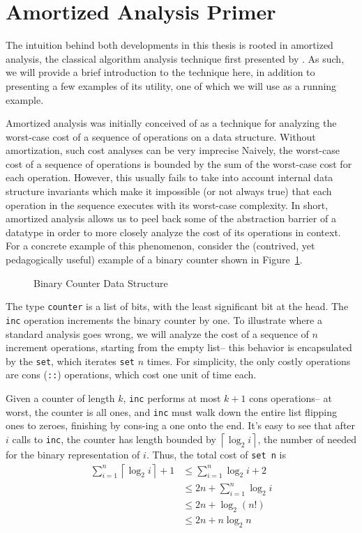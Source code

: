 

\section{Amortized Analysis Primer}
\label{sec:amortized-primer}
The intuition behind both developments in this thesis is rooted in amortized analysis, the classical algorithm analysis technique first presented by \citet{tarjan:amortized-complexity}. As such, we will provide a brief introduction to the technique here, in addition to presenting a few examples of its utility, one of which we will use as a running example.

Amortized analysis was initially conceived of as a technique for analyzing the worst-case cost of a sequence of operations on a data structure. Without amortization, such cost analyses can be very imprecise Naively, the worst-case cost of a sequence of operations is bounded by the sum of the worst-case cost for each operation. However, this usually fails to take into account internal data structure invariants which make it impossible (or not always true) that each operation in the sequence executes with its worst-case complexity. In short, amortized analysis allows us to peel back some of the abstraction barrier of a datatype in order to more closely analyze the cost of its operations in context. For a concrete example of this phenomenon, consider the (contrived, yet pedagogically useful) example of a binary counter shown in Figure~\ref{fig:bin-counter}.

\begin{figure}
  \caption{Binary Counter Data Structure}
  \label{fig:bin-counter}
\end{figure}

The type \texttt{counter} is a list of bits, with the least significant bit at the head. The \texttt{inc} operation increments the binary counter by one. To illustrate where a standard analysis goes wrong, we will analyze the cost of a sequence of $n$ increment operations, starting from the empty list-- this behavior is encapsulated by the \texttt{set}, which iterates \texttt{set} $n$ times. For simplicity, the only costly operations are cons (\texttt{::}) operations, which cost one unit of time each.

Given a counter of length $k$, \texttt{inc} performs at most $k + 1$ cons operations-- at worst, the counter is all ones, and \texttt{inc} must walk down the entire list flipping ones to zeroes, finishing by cons-ing a one onto the end. It's easy to see that after $i$ calls to \texttt{inc}, the counter has length bounded by $\left \lceil{\log_2 i}\right \rceil$, the number of needed for the binary representation of $i$. Thus, the total cost of \texttt{set n} is
\begin{align*}
  \sum_{i=1}^n \left\lceil{\log_2 i}\right \rceil + 1
  &\leq \sum_{i=1}^n \log_2 i + 2\\
  &\leq 2n + \sum_{i=1}^n \log_2 i\\
  &\leq 2n + \log_2(n!)\\
  &\leq 2n + n\log_2 n
\end{align*}

